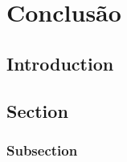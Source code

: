 \chapter{Conclusão}

\section{Introduction}

\lipsum[1]

\section{Section}

\lipsum[1]

\subsection{Subsection}

\lipsum[1]